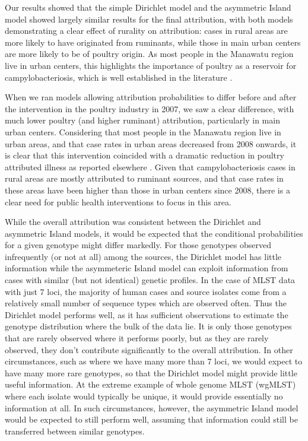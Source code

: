 \documentclass[times, doublespace]{simauth}%
\begin{document}
Our results showed that the simple Dirichlet model and the asymmetric Island model showed largely similar results for the final attribution, with both models demonstrating a clear effect of rurality on attribution: cases in rural areas are more likely to have originated from ruminants, while those in main urban centers are more likely to be of poultry origin. As most people in the Manawatu region live in urban centers, this highlights the importance of poultry as a reservoir for campylobacteriosis, which is well established in the literature \cite{MullA, Marsh, MullM, Leve}.

When we ran models allowing attribution probabilities to differ before and after the intervention in the poultry industry in 2007, we saw a clear difference, with much lower poultry (and higher ruminant) attribution, particularly in main urban centers. Considering that most people in the Manawatu region live in urban areas, and that case rates in urban areas decreased from 2008 onwards, it is clear that this intervention coincided with a dramatic reduction in poultry attributed illness as reported elsewhere \cite{AnnS}. Given that campylobacteriosis cases in rural areas are mostly attributed to ruminant sources, and that case rates in these areas have been higher than those in urban centers since 2008, there is a clear need for public health interventions to focus in this area.

While the overall attribution was consistent between the Dirichlet and asymmetric Island models, it would be expected that the conditional probabilities for a given genotype might differ markedly. For those genotypes observed infrequently (or not at all) among the sources, the Dirichlet model has little information while the asymmeteric Island model can exploit information from cases with similar (but not identical) genetic profiles. In the case of MLST data with just 7 loci, the majority of human cases and source isolates come from a relatively small number of sequence types which are observed often. Thus the Dirichlet model performs well, as it has sufficient observations to estimate the genotype distribution where the bulk of the data lie. It is only those genotypes that are rarely observed where it performs poorly, but as they are rarely observed, they don't contribute significantly to the overall attribution. In other circumstances, such as where we have many more than 7 loci, we would expect to have many more rare genotypes, so that the Dirichlet model might provide little useful information. At the extreme example of whole genome MLST (wgMLST) where each isolate would typically be unique, it would provide essentially no information at all. In such circumstances, however, the asymmetric Island model would be expected to still perform well, assuming that information could still be transferred between similar genotypes.
\end{document}

